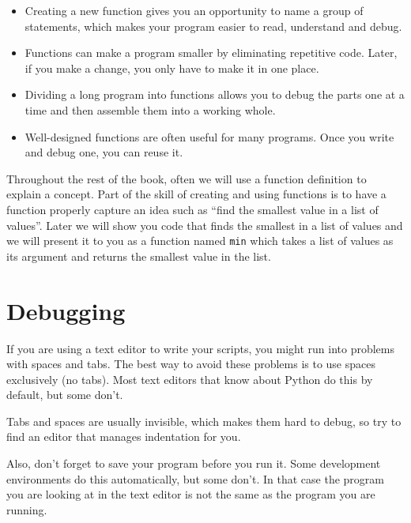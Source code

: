 \begin{itemize}

\item Creating a new function gives you an opportunity to name a group
of statements, which makes your program easier to read, understand 
and debug.

\item Functions can make a program smaller by eliminating repetitive
code.  Later, if you make a change, you only have
to make it in one place.

\item Dividing a long program into functions allows you to debug the
parts one at a time and then assemble them into a working whole.

\item Well-designed functions are often useful for many programs.
Once you write and debug one, you can reuse it.

\end{itemize}

Throughout the rest of the book, often we will use a function definition to 
explain a concept.  Part of the skill of creating and using functions is
to have a function properly capture an idea such as ``find the smallest
value in a list of values''.  Later we will show you code that finds
the smallest in a list of values and we will present it to you as a function
named {\tt min} which takes a list of values as its argument and 
returns the smallest value in the list.


\section{Debugging}
\label{editor}

If you are using a text editor to write your scripts, you might
run into problems with spaces and tabs.  The best way to avoid
these problems is to use spaces exclusively (no tabs).  Most text
editors that know about Python do this by default, but some
don't.


Tabs and spaces are usually invisible, which makes them
hard to debug, so try to find an editor that manages indentation
for you.

Also, don't forget to save your program before you run it.  Some
development environments do this automatically, but some don't.
In that case the program you are looking at in the text editor
is not the same as the program you are running.

